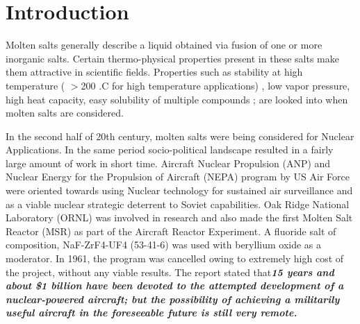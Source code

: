 \section{Introduction}

Molten salts generally describe a liquid obtained via fusion of one or more inorganic salts. Certain thermo-physical properties present in these salts make them attractive in scientific fields. Properties such as stability at high temperature ( $>$200 .C for high temperature applications) , low vapor pressure, high heat capacity, easy solubility of multiple compounds ; are looked into when molten salts are considered.\newline 

In the second half of 20th century, molten salts were being considered for Nuclear Applications. In the same period socio-political landscape resulted in a fairly large amount of work in short time. Aircraft Nuclear Propulsion (ANP) and Nuclear Energy for the Propulsion of Aircraft (NEPA) program by US Air Force were oriented towards using Nuclear technology for sustained air surveillance and as a viable nuclear strategic deterrent to Soviet capabilities. Oak Ridge National Laboratory (ORNL) was involved in research and also made the first Molten Salt Reactor (MSR) as part of the Aircraft Reactor Experiment. A fluoride salt of composition, NaF-ZrF4-UF4 (53-41-6) was used with beryllium oxide as a moderator. In 1961, the program was cancelled owing to extremely high cost of the project, without any viable results. The report stated that\textbf{\textit{15 years and about \$1 billion have been devoted to the attempted development of a nuclear-powered aircraft; but the possibility of achieving a militarily useful aircraft in the foreseeable future is still very remote.}} \cite{York} \newline  


